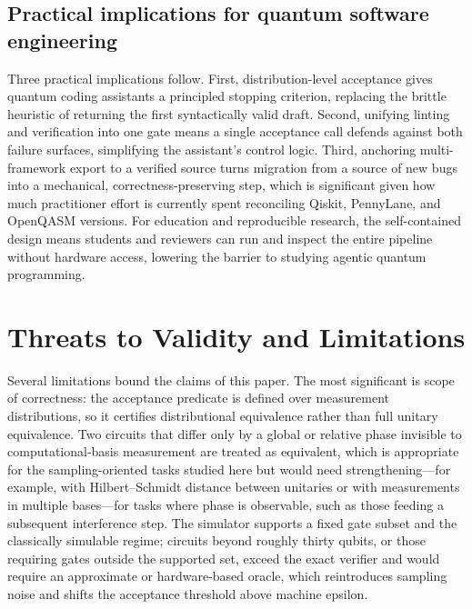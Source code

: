 \documentclass[11pt,a4paper]{article}
\begin{document}
\subsection{Practical implications for quantum software engineering}
Three practical implications follow. First, distribution-level acceptance gives quantum coding assistants a principled stopping criterion, replacing the brittle heuristic of returning the first syntactically valid draft. Second, unifying linting and verification into one gate means a single acceptance call defends against both failure surfaces, simplifying the assistant's control logic. Third, anchoring multi-framework export to a verified source turns migration from a source of new bugs into a mechanical, correctness-preserving step, which is significant given how much practitioner effort is currently spent reconciling Qiskit, PennyLane, and OpenQASM versions. For education and reproducible research, the self-contained design means students and reviewers can run and inspect the entire pipeline without hardware access, lowering the barrier to studying agentic quantum programming.

\section{Threats to Validity and Limitations}
\label{sec:threats}

Several limitations bound the claims of this paper. The most significant is scope of correctness: the acceptance predicate is defined over measurement distributions, so it certifies distributional equivalence rather than full unitary equivalence. Two circuits that differ only by a global or relative phase invisible to computational-basis measurement are treated as equivalent, which is appropriate for the sampling-oriented tasks studied here but would need strengthening---for example, with Hilbert--Schmidt distance between unitaries or with measurements in multiple bases---for tasks where phase is observable, such as those feeding a subsequent interference step. The simulator supports a fixed gate subset and the classically simulable regime; circuits beyond roughly thirty qubits, or those requiring gates outside the supported set, exceed the exact verifier and would require an approximate or hardware-based oracle, which reintroduces sampling noise and shifts the acceptance threshold above machine epsilon.
\end{document}
